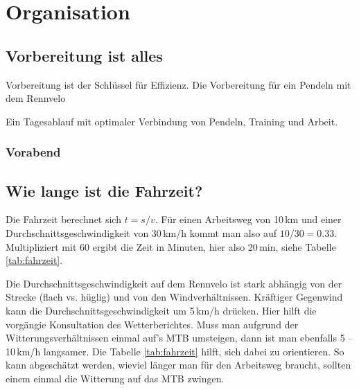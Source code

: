 \chapter{Organisation}

\section{Vorbereitung ist alles}

Vorbereitung ist der Schlüssel für Effizienz.
Die Vorbereitung für ein Pendeln mit dem Rennvelo

Ein Tagesablauf mit optimaler Verbindung von Pendeln, Training und Arbeit.

\subsection{Vorabend}


\section{Wie lange ist die Fahrzeit?}

Die Fahrzeit berechnet sich $t = s/v$.
Für einen Arbeitsweg von 10\,km und einer Durchschnittsgeschwindigkeit von 30\,km/h kommt man also auf $10/30=0.33$.
Multipliziert mit 60 ergibt die Zeit in Minuten, hier also 20\,min, siehe Tabelle \ref{tab:fahrzeit}.

Die Durchschnittsgeschwindigkeit auf dem Rennvelo ist stark abhängig von der Strecke (flach vs. hüglig) und von den Windverhältnissen.
Kräftiger Gegenwind kann die Durchschnittsgeschwindigkeit um 5\,km/h drücken.
Hier hilft die vorgängie Konsultation des Wetterberichtes.
Muss man aufgrund der Witterungsverhältnissen einmal auf's MTB umsteigen, dann ist man ebenfalls 5 -- 10\,km/h langsamer.
Die Tabelle \ref{tab:fahrzeit} hilft, sich dabei zu orientieren.
So kann abgeschätzt werden, wieviel länger man für den Arbeitsweg braucht,
sollten einem einmal die Witterung auf das MTB zwingen.


